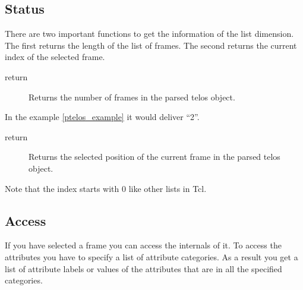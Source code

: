  \subsection{Status}
	There are two important functions to get the information of the
	 list dimension. The first returns the length of the list of frames.
	 The second returns the current index of the selected frame. \\
	\begin{method}{ }
    	  \begin{description}
	     \item[ return] 
		Returns the number of frames in the parsed telos object.
	  \end{description}
	  In the example \ref{ptelos_example} it would deliver ``2''.
	\end{method}
	\begin{method}{ }
    	  \begin{description}	
	     \item[ return] 
		Returns the selected position of the current frame 
		 in the parsed telos object.
	  \end{description}
	\end{method}	
	Note that the index starts with 0 like other lists in Tcl.

 \subsection{Access}
	If you have selected a frame you can access the internals of it. 
	To access the attributes you have to specify a list of attribute 
	 categories. As a result you get a list of attribute labels or values 
	of the attributes that are in all the specified categories.
	\\

